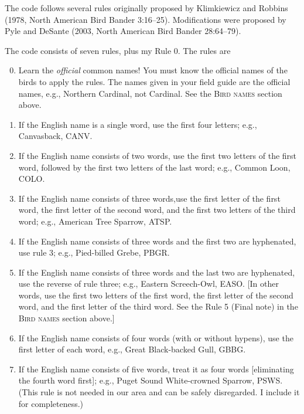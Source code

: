 \documentclass[11pt]{article}
\begin{document}
The code follows several rules originally proposed by Klimkiewicz and Robbins (1978, North American Bird Bander 3:16–25). Modifications were proposed by Pyle and DeSante (2003, North American Bird Bander 28:64–79).

The code consists of seven rules, plus my Rule 0.  The rules are

\begin{enumerate}
\setcounter{enumi}{-1}
\item Learn the \emph{official} common names! You must know the official names of the birds to apply the rules. The names given in your field guide are the official names, e.g., Northern Cardinal, not Cardinal. See the \textsc{Bird names} section above.

\item If the English name is a single word, use the
first four letters; e.g., Canvasback, CANV.

\item If the English name consists of two words, use
the first two letters of the first word, followed by
the first two letters of the last word; e.g.,
Common Loon, COLO.

\item If the English name consists of three words,use the first letter of the first word, the first letter of the second word, and the first two letters of the third word; e.g., American Tree Sparrow, ATSP.

\item If the English name consists of three words and
the first two are hyphenated, use rule 3; e.g.,
Pied-billed Grebe, PBGR.

\item If the English name consists of three words and the last two are hyphenated, use the reverse of rule three; e.g., Eastern Screech-Owl, EASO. [In other words, use the first two letters of the first word, the first letter of the second word, and the first letter of the third word. See the Rule 5 (Final note) in the \textsc{Bird names} section above.]

\item If the English name consists of four words
(with or without hypens), use the first letter of
each word, e.g., Great Black-backed Gull,
GBBG.

\item If the English name consists of five words, treat
it as four words [eliminating the fourth word first]; e.g., Puget Sound White-crowned Sparrow, PSWS. (This rule is not needed in our area and can be safely disregarded. I include it for completeness.)

\end{enumerate}
\end{document}
